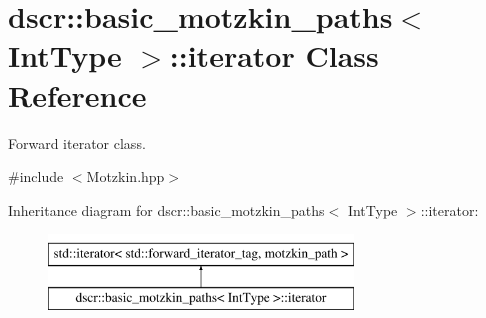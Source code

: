 \hypertarget{classdscr_1_1basic__motzkin__paths_1_1iterator}{\section{dscr\-:\-:basic\-\_\-motzkin\-\_\-paths$<$ Int\-Type $>$\-:\-:iterator Class Reference}
\label{classdscr_1_1basic__motzkin__paths_1_1iterator}
}


Forward iterator class.  




{\ttfamily \#include $<$Motzkin.\-hpp$>$}

Inheritance diagram for dscr\-:\-:basic\-\_\-motzkin\-\_\-paths$<$ Int\-Type $>$\-:\-:iterator\-:\begin{figure}[H]
\begin{center}
\leavevmode
\includegraphics[height=2.000000cm]{classdscr_1_1basic__motzkin__paths_1_1iterator}
\end{center}
\end{figure}
